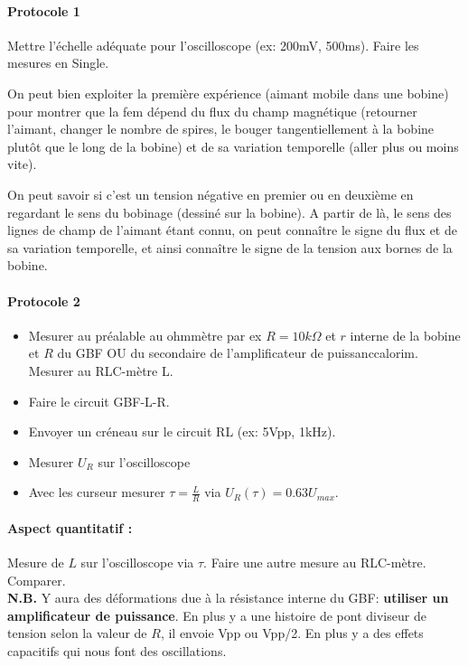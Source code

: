\documentclass[11pt]{report}
\numberwithin{figure}{section}
\numberwithin{equation}{section}
\numberwithin{table}{section}
\newcommand{\1}{\boldsymbol{1}}
\begin{document}
\begin{tcolorbox}[breakable, enhanced, colback=red!2!white,colframe=mycolor!85!black,title=\textbf{\textbf{Expérience}}]
\paragraph*{Protocole 1}  

Mettre l'échelle adéquate pour l'oscilloscope (ex: 200mV, 500ms). Faire les mesures en Single.

On peut bien exploiter la première expérience (aimant mobile dans une bobine) pour montrer que la fem dépend du flux du champ magnétique (retourner l’aimant, changer le nombre de spires, le bouger tangentiellement à la bobine plutôt que
le long de la bobine) et de sa variation temporelle (aller plus ou moins vite).	

On peut savoir si c'est un tension négative en premier ou en deuxième en regardant le sens du bobinage (dessiné sur la bobine). A partir de là, le sens des lignes de champ de l’aimant étant connu, on peut connaître le signe du flux et de sa variation temporelle, et ainsi connaître le signe de la tension aux bornes de la bobine.


\paragraph*{Protocole 2} 

\begin{itemize}[label=$\triangleright$]
\item Mesurer au préalable au ohmmètre par ex $R = 10k\Omega$ et $r$ interne de la bobine et $R$ du GBF OU du secondaire de l'amplificateur de puissanccalorim. Mesurer au RLC-mètre L.
\item Faire le circuit GBF-L-R.
		\item Envoyer un créneau sur le circuit RL (ex: 5Vpp, 1kHz).
		\item Mesurer $U_R$ sur l'oscilloscope
		\item Avec les curseur mesurer $\tau = \frac{L}{R}$ via $U_R(\tau) = 0.63 U_{max}$.
\end{itemize}

\paragraph*{Aspect quantitatif :} Mesure de $L$ sur l'oscilloscope via $\tau$. Faire une autre mesure au RLC-mètre. Comparer. \\

\textbf{N.B.} Y aura des déformations due à la résistance interne du GBF: \textbf{utiliser un amplificateur de puissance}. En plus y a une histoire de pont diviseur de tension selon la valeur de $R$, il envoie Vpp ou Vpp/2. En plus y a des effets capacitifs qui nous font des oscillations.

\end{tcolorbox}
\end{document}
